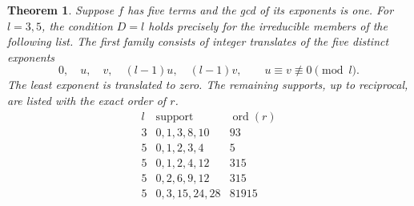 \documentclass[11pt]{article}
\newtheorem{theorem}{Theorem}
\begin{document}
\begin{theorem}\label{thm:half-field-powers}
Suppose \(f\) has five terms and the gcd of its exponents is one.
For \(l=3,5\), the condition \(D=l\) holds precisely for the
irreducible members of the following list. The first family consists
of integer translates of the five distinct exponents
\[
       0,\quad u,\quad v,\quad (l-1)u,\quad (l-1)v,
       \qquad u\equiv v\not\equiv0\pmod l .
\]
The least exponent is translated to zero. The remaining supports,
up to reciprocal, are listed with the exact order of \(r\).
\[
\begin{array}{c|l|r}
l&\text{support}&\operatorname{ord}(r)\\\hline
3&0,1,3,8,10&93\\
5&0,1,2,3,4&5\\
5&0,1,2,4,12&315\\
5&0,2,6,9,12&315\\
5&0,3,15,24,28&81915
\end{array}
\]
\end{theorem}
\end{document}

